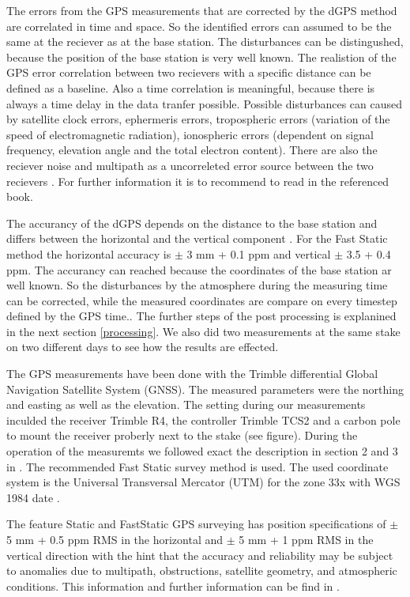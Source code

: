 The errors from the GPS measurements that are corrected by the dGPS method are correlated in time and space.
So the identified errors can assumed to be the same at the reciever as at the base station.
The disturbances can be distingushed, because the position of the base station is very well known.
The realistion of the GPS error correlation between two recievers with a specific distance can be defined as a baseline.
Also a time correlation is meaningful, because there is always a time delay in the data tranfer possible.
Possible disturbances can caused by satellite clock errors, ephermeris errors, tropospheric errors (variation of the speed of electromagnetic radiation), ionospheric errors (dependent on signal frequency, elevation angle and the total electron content). 
There are also the reciever noise and multipath as a uncorreleted error source between the two recievers \citep{UGPS}.
For further information it is to recommend to read in the referenced book.
\medskip

The accurancy of the dGPS depends on the distance to the base station and differs between the horizontal and the vertical component \citep{Trquickstart}.
For the Fast Static method the horizontal accuracy is $ \pm $ 3 mm + 0.1 ppm and vertical $ \pm $ 3.5 + 0.4 ppm.
The accurancy can reached because the coordinates of the base station ar well known. 
So the disturbances by the atmosphere during the measuring time can be corrected, while the measured coordinates are compare on every timestep defined by the GPS time.. 
The further steps of the post processing is explanined in the next section 
\ref{processing}.
We also did two measurements at the same stake on two different days to see how the results are effected.
\medskip

The GPS measurements have been done with the Trimble differential Global Navigation Satellite System (GNSS). 
The measured parameters were the northing and easting as well as the elevation.
The setting during our measurements inculded the receiver Trimble R4, the controller Trimble TCS2 and a carbon pole to mount the receiver proberly next to the stake (see figure).
During the operation of the measuremts we followed exact the description in section 2 and 3 in \cite{Trquickstart}. 
The recommended Fast Static survey method is used.
The used coordinate system is the Universal Transversal Mercator (UTM) for the zone 33x with WGS 1984 date  \citep{Trquickstart}. 

The feature Static and FastStatic GPS surveying has position specifications of $ \pm $ 5 mm + 0.5 ppm RMS in the horizontal and $ \pm $ 5 mm + 1 ppm RMS in the vertical direction with the hint that the accuracy and reliability may be subject to anomalies due to multipath, obstructions, satellite geometry, and atmospheric conditions.
This information and further information can be find in \cite{Truserguide}.
\medskip

